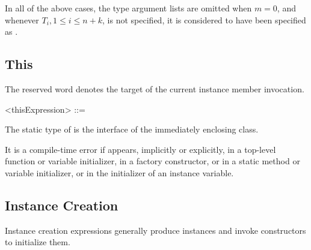 \documentclass[makeidx]{article}
\begin{document}
\LMHash{}%
In all of the above cases,
the type argument lists are omitted when $m=0$,
and whenever $T_i, 1 \le i \le n+k$, is not specified,
it is considered to have been specified as \DYNAMIC{}.


\subsection{This}

\LMHash{}%
The reserved word \THIS{} denotes the target of the current instance member invocation.

\begin{grammar}
<thisExpression> ::= \THIS{}
\end{grammar}

\LMHash{}%
The static type of \THIS{} is the interface of the immediately enclosing class.


\LMHash{}%
It is a compile-time error if \THIS{} appears, implicitly or explicitly, in a top-level function or variable initializer, in a factory constructor, or in a static method or variable initializer, or in the initializer of an instance variable.


\subsection{Instance Creation}

\LMHash{}%
Instance creation expressions generally produce instances
and invoke constructors to initialize them.



\end{document}
